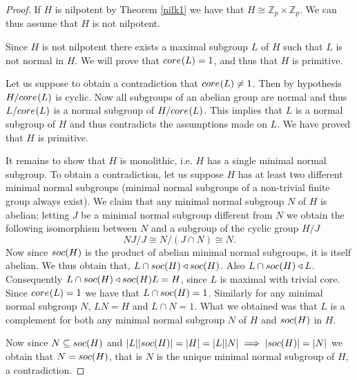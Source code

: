 \begin{proof}
    If $H$ is nilpotent by Theorem \ref{nilk1} we have that $H \cong \mathbb{Z}_p \times \mathbb{Z}_p$. We can thus assume that $H$ is not nilpotent.

    Since $H$ is not nilpotent there exists a maximal subgroup $L$ of $H$ such that $L$ is not normal in $H$. We will prove that $core_{}({L}) = 1$, and thus that $H$ is primitive. 
    
    Let us suppose to obtain a contradiction that $core_{}({L}) \ne 1$. 
    Then by hypothesis $H/core_{}({L})$ is cyclic. Now all subgroups of an abelian group are normal and thus $L/core_{}({L})$ is a normal subgroup of $H/core_{}({L})$. 
    This implies that $L$ is a normal subgroup of $H$ and thus contradicts the assumptions made on $L$. We have proved that $H$ is primitive.

    It remains to show that $H$ is monolithic, i.e. $H$ has a single minimal normal subgroup. To obtain a contradiction, let us suppose $H$ has at least two different minimal normal subgroups (minimal normal subgroups of a non-trivial finite group always exist). We claim that any minimal normal subgroup $N$ of $H$ is abelian; letting $J$ be a minimal normal subgroup different from $N$ we obtain the following isomorphism between $N$ and a subgroup of the cyclic group $H/J$
    $$
        NJ/J \cong N/(J \cap N) \cong N.
    $$
    Now since $soc {(H)}$ is the product of abelian minimal normal subgroups, it is itself abelian. We thus obtain that, $L \cap soc {(H)} \triangleleft soc {(H)}$. Also $L \cap soc {(H)} \triangleleft L$. Consequently $L \cap soc {(H)} \triangleleft soc {(H)}L = H$, since $L$ is maximal with trivial core.
    Since $core_{}({L}) = 1$ we have that $L \cap soc {(H)} = 1$. Similarly for any minimal normal subgroup $N$, $LN=H$ and $L \cap N = 1$. What we obtained was that $L$ is a complement for both any minimal normal subgroup $N$ of $H$ and $soc {(H)}$ in $H$.

    Now since $N \subseteq soc {(H)}$ and $| L || soc {(H)} | = | H | = | L || N | \implies | soc {(H)} | = | N |$ we obtain that $N = soc {(H)}$, that is $N$ is the unique minimal normal subgroup of $H$, a contradiction.
\end{proof}